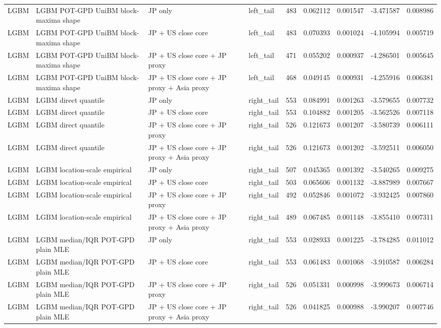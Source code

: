 \begin{tabular}{lll lrrrrr}
LGBM & LGBM POT-GPD UniBM block-maxima shape & JP only & left\_tail & 483 & 0.062112 & 0.001547 & -3.471587 & 0.008986 \\
LGBM & LGBM POT-GPD UniBM block-maxima shape & JP + US close core & left\_tail & 483 & 0.070393 & 0.001024 & -4.105994 & 0.005719 \\
LGBM & LGBM POT-GPD UniBM block-maxima shape & JP + US close core + JP proxy & left\_tail & 471 & 0.055202 & 0.000937 & -4.286501 & 0.005645 \\
LGBM & LGBM POT-GPD UniBM block-maxima shape & JP + US close core + JP proxy + Asia proxy & left\_tail & 468 & 0.049145 & 0.000931 & -4.255916 & 0.006381 \\
LGBM & LGBM direct quantile & JP only & right\_tail & 553 & 0.084991 & 0.001263 & -3.579655 & 0.007732 \\
LGBM & LGBM direct quantile & JP + US close core & right\_tail & 553 & 0.104882 & 0.001205 & -3.562526 & 0.007118 \\
LGBM & LGBM direct quantile & JP + US close core + JP proxy & right\_tail & 526 & 0.121673 & 0.001207 & -3.580739 & 0.006111 \\
LGBM & LGBM direct quantile & JP + US close core + JP proxy + Asia proxy & right\_tail & 526 & 0.121673 & 0.001202 & -3.592511 & 0.006050 \\
LGBM & LGBM location-scale empirical & JP only & right\_tail & 507 & 0.045365 & 0.001392 & -3.540265 & 0.009275 \\
LGBM & LGBM location-scale empirical & JP + US close core & right\_tail & 503 & 0.065606 & 0.001132 & -3.887989 & 0.007667 \\
LGBM & LGBM location-scale empirical & JP + US close core + JP proxy & right\_tail & 492 & 0.052846 & 0.001072 & -3.932425 & 0.007860 \\
LGBM & LGBM location-scale empirical & JP + US close core + JP proxy + Asia proxy & right\_tail & 489 & 0.067485 & 0.001148 & -3.855410 & 0.007311 \\
LGBM & LGBM median/IQR POT-GPD plain MLE & JP only & right\_tail & 553 & 0.028933 & 0.001225 & -3.784285 & 0.011012 \\
LGBM & LGBM median/IQR POT-GPD plain MLE & JP + US close core & right\_tail & 553 & 0.061483 & 0.001068 & -3.910587 & 0.006284 \\
LGBM & LGBM median/IQR POT-GPD plain MLE & JP + US close core + JP proxy & right\_tail & 526 & 0.051331 & 0.000998 & -3.999673 & 0.006714 \\
LGBM & LGBM median/IQR POT-GPD plain MLE & JP + US close core + JP proxy + Asia proxy & right\_tail & 526 & 0.041825 & 0.000988 & -3.990207 & 0.007746 \\

\end{tabular}
